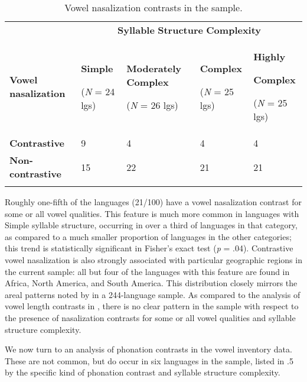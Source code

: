 \begin{table}
\begin{tabularx}{\textwidth}{XXXXX}
 & \multicolumn{4}{c}{ \textbf{Syllable} \textbf{Structure} \textbf{Complexity}}\\
\lsptoprule
\textbf{Vowel} \textbf{nasalization} & { \textbf{Simple}}

 (\textit{N} = 24 lgs) & { \textbf{Moderately} \textbf{Complex}}

 (\textit{N} = 26 lgs) & { \textbf{Complex}}

 (\textit{N} = 25 lgs) & { \textbf{Highly} }

{ \textbf{Complex}}

 (\textit{N} = 25 lgs)\\
\textbf{Contrastive} & 9 & 4 & 4 & 4\\
\textbf{Non-contrastive} & 15 & 22 & 21 & 21\\
\lspbottomrule
\end{tabularx}
\caption{\label{4.4}Vowel nasalization contrasts in the sample.}
\end{table}

  Roughly one-fifth of the languages (21/100) have a vowel nasalization contrast for some or all vowel qualities. This feature is much more common in languages with Simple syllable structure, occurring in over a third of languages in that category, as compared to a much smaller proportion of languages in the other categories; this trend is statistically significant in Fisher’s exact test (\textit{p} = .04). Contrastive vowel nasalization is also strongly associated with particular geographic regions in the current sample: all but four of the languages with this feature are found in Africa, North America, and South America. This distribution closely mirrors the areal patterns noted by \citet{Hajek2013} in a 244-language sample. As compared to the analysis of vowel length contrasts in , there is no clear pattern in the sample with respect to the presence of nasalization contrasts for some or all vowel qualities and syllable structure complexity.

  We now turn to an analysis of phonation contrasts in the vowel inventory data. These are not common, but do occur in six languages in the sample, listed in .5 by the specific kind of phonation contrast and syllable structure complexity.

